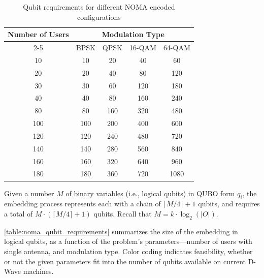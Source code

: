 \begin{table}[h]
\centering
\caption{Qubit requirements for different NOMA encoded configurations}
\label{table:noma_qubit_requirements}
\begin{tabular}{@{}ccccc@{}}
\toprule
\multirow{2}{*}{Number of Users} & \multicolumn{4}{c}{Modulation Type} \\ \cmidrule(l){2-5} 
 & BPSK & QPSK & 16-QAM & 64-QAM \\ \midrule
10 & \cellcolor{green!25}10 & \cellcolor{green!25}20 & \cellcolor{green!25}40 & \cellcolor{yellow!40}60 \\
20 & \cellcolor{green!25}20 & \cellcolor{green!25}40 & \cellcolor{green!25}80 & \cellcolor{yellow!40}120 \\
30 & \cellcolor{green!25}30 & \cellcolor{green!25}60 & \cellcolor{yellow!40}120 & \cellcolor{yellow!40}180 \\
40 & \cellcolor{green!25}40 & \cellcolor{green!25}80 & \cellcolor{yellow!40}160 & \cellcolor{yellow!40}240 \\
80 & \cellcolor{green!25}80 & \cellcolor{yellow!40}160 & \cellcolor{yellow!40}320 & \cellcolor{red!25}480 \\
100 & \cellcolor{green!25}100 & \cellcolor{yellow!40}200 & \cellcolor{yellow!40}400 & \cellcolor{red!25}600 \\
120 & \cellcolor{yellow!40}120 & \cellcolor{yellow!40}240 & \cellcolor{red!25}480 & \cellcolor{red!25}720 \\
140 & \cellcolor{yellow!40}140 & \cellcolor{yellow!40}280 & \cellcolor{red!25}560 & \cellcolor{red!25}840 \\
160 & \cellcolor{yellow!40}160 & \cellcolor{yellow!40}320 & \cellcolor{red!25}640 & \cellcolor{red!25}960 \\
180 & \cellcolor{yellow!40}180 & \cellcolor{yellow!40}360 & \cellcolor{red!25}720 & \cellcolor{red!25}1080 \\
\bottomrule
\end{tabular}
\end{table}
Given a number $M$ of binary variables (i.e., logical qubits) in QUBO form $q_i$, the 
embedding process represents each with a chain of $\lceil M/4 \rceil + 1$ qubits, and requires 
a total of $M \cdot (\lceil M/4 \rceil + 1)$ qubits. Recall that $M = k \cdot \log_2(|O|)$.

\autoref{table:noma_qubit_requirements} summarizes the size of the embedding in logical qubits, as a function of the 
problem's parameters—number of users with single antenna, and modulation type. Color 
coding indicates feasibility, whether or not the given parameters fit into the number 
of qubits available on current D-Wave machines.

